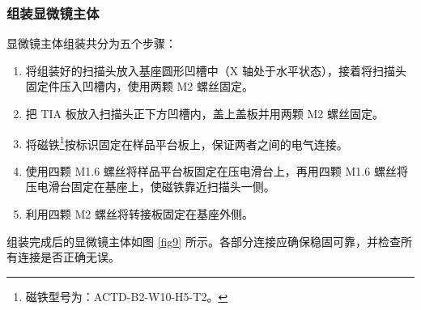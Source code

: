 \documentclass{article}
\begin{document}
\begin{spacing}{1.625}
	
	
	
	
	\subsubsection{组装显微镜主体}
	显微镜主体组装共分为五个步骤：
	\begin{enumerate}
		\item 将组装好的扫描头放入基座圆形凹槽中（X 轴处于水平状态），接着将扫描头固定件压入凹槽内，使用两颗 M2 螺丝固定。
		\item 把 TIA 板放入扫描头正下方凹槽内，盖上盖板并用两颗 M2 螺丝固定。
		\item 将磁铁\footnote{磁铁型号为：ACTD-B2-W10-H5-T2。}按标识固定在样品平台板上，保证两者之间的电气连接。
		\item 使用四颗 M1.6 螺丝将样品平台板固定在压电滑台上，再用四颗 M1.6 螺丝将压电滑台固定在基座上，使磁铁靠近扫描头一侧。
		\item 利用四颗 M2 螺丝将转接板固定在基座外侧。
	\end{enumerate}
	组装完成后的显微镜主体如图 \ref{fig9} 所示。各部分连接应确保稳固可靠，并检查所有连接是否正确无误。
	\begin{figure}[htbp]
		\centering
		\hfill
		\begin{subfigure}{0.4\textwidth}
			\centering
\end{subfigure}
\end{figure}
\end{spacing}
\end{document}
